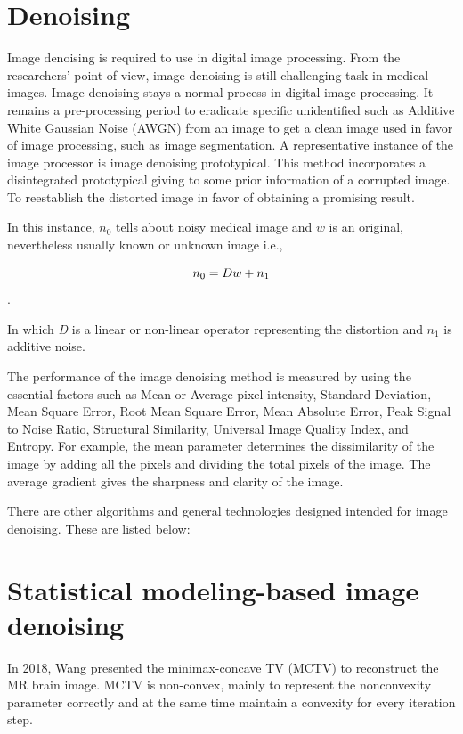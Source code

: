 \section{Denoising}
Image denoising is required to use in digital image processing. From the researchers’ point of view, image denoising is still challenging task in medical images. Image denoising stays a normal process in digital image processing. It remains a pre-processing period to eradicate specific unidentified such as Additive White Gaussian Noise (AWGN) from an image to get a clean image used in favor of image processing, such as image segmentation. A representative instance of the image processor is image denoising prototypical. This method incorporates a disintegrated prototypical giving to some prior information of a corrupted image. To reestablish the distorted image in favor of obtaining a promising result. 

In this instance, \textit{$n_0$} tells about noisy medical image and $\textit{w}$ is an original, nevertheless usually known or unknown image i.e.,

\begin{equation}
	\centering
	n_0 = Dw + n_1
\end{equation}.

In which \textit{D} is a linear or non-linear operator representing the distortion and \textit{$n_1$} is additive noise.

The performance of the image denoising method is measured by using the essential factors such as Mean or Average pixel intensity, Standard Deviation, Mean Square Error, Root Mean Square Error, Mean Absolute Error, Peak Signal to Noise Ratio, Structural Similarity, Universal Image Quality Index, and Entropy. For example, the mean parameter determines the dissimilarity of the image by adding all the pixels and dividing the total pixels of the image. The average gradient gives the sharpness and clarity of the image.

There are other algorithms and general technologies designed intended for image denoising. These are listed below:

\section{Statistical modeling-based image denoising}

In 2018, Wang presented the minimax-concave TV (MCTV) to reconstruct the MR brain image. MCTV is non-convex, mainly to represent the nonconvexity parameter correctly and at the same time maintain a convexity for every iteration step.

